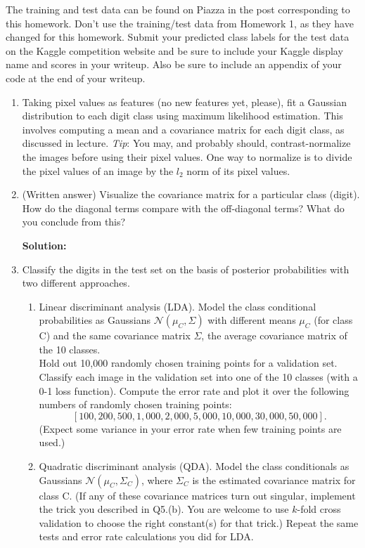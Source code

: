 \documentclass{article}
\newcommand{\solution}{\textbf{Solution: }}
\renewcommand{\N}{\mathcal{N}}
\begin{document}
\noindent
The training and test data can be found on Piazza in the post corresponding to this homework. Don’t use the training/test data from Homework 1, as they have changed for this homework. Submit your predicted class labels for the test data on the Kaggle competition website and be sure to include your Kaggle display name and scores in your writeup. Also be sure to include an appendix of your code at the end of your writeup.

\begin{enumerate}[label=(\alph*)]
    \item Taking pixel values as features (no new features yet, please), fit a Gaussian distribution to each digit class using maximum likelihood estimation. This involves computing a mean and a covariance matrix for each digit class, as discussed in lecture. \emph{Tip}: You may, and probably should, contrast-normalize the images before using their pixel values. One way to normalize is to divide the pixel values of an image by the $l_2$ norm of its pixel values.
    \item (Written answer) Visualize the covariance matrix for a particular class (digit). How do the diagonal terms compare with the off-diagonal terms? What do you conclude from this?
    \begin{mdframed} \solution
    \end{mdframed}

    \item Classify the digits in the test set on the basis of posterior probabilities with two different approaches.
    \begin{enumerate}[label=(\roman*)]
        \item Linear discriminant analysis (LDA). Model the class conditional probabilities as Gaussians $\N(\mu_C, \Sigma)$ with different means $\mu_C$ (for class C) and the same covariance matrix $\Sigma$, the average covariance matrix of the 10 classes. \\

        Hold out 10,000 randomly chosen training points for a validation set. Classify each image in the validation set into one of the 10 classes (with a 0-1 loss function). Compute the error rate and plot it over the following numbers of randomly chosen training points: $$[100, 200, 500, 1,000, 2,000, 5,000, 10,000, 30,000, 50,000].$$ (Expect some variance in your error rate when few training points are used.)

        \item Quadratic discriminant analysis (QDA). Model the class conditionals as Gaussians $\N(\mu_C, \Sigma_C)$, where $\Sigma_C$ is the estimated covariance matrix for class C. (If any of these covariance matrices turn out singular, implement the trick you described in Q5.(b). You are welcome to use $k$-fold cross validation to choose the right constant(s) for that trick.) Repeat the same tests and error rate calculations you did for LDA.


\end{enumerate}
\end{enumerate}
\end{document}
